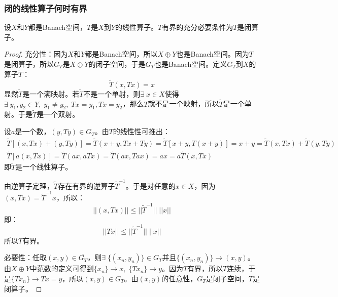 \subsubsection{闭的线性算子何时有界}
\begin{theorem}
	设$X$和$Y$都是Banach空间，$T$是$X$到$Y$的线性算子。$T$有界的充分必要条件为$T$是闭算子。
\end{theorem}
\begin{proof}
	充分性：因为$X$和$Y$都是Banach空间，所以$X\oplus Y$也是Banach空间。因为$T$是闭算子，所以$G_T$是$X\oplus Y$的闭子空间，于是$G_T$也是Banach空间。定义$G_T$到$X$的算子$\tilde{T}$：
	\begin{equation*}
		\tilde{T}(x,Tx)=x
	\end{equation*}
	显然$\tilde{T}$是一个满映射。若$\tilde{T}$不是一个单射，则$\exists\;x\in X$使得$\exists\;y_1,y_2\in Y,\;y_1\ne y_2,\;Tx=y_1,Tx=y_2$，那么$T$就不是一个映射，所以$\tilde{T}$是一个单射。于是$\tilde{T}$是一个双射。\par
	设$a$是一个数，$(y,Ty)\in G_T$。由$T$的线性性可推出：
	\begin{gather*}
		\tilde{T}[(x,Tx)+(y,Ty)]=\tilde{T}(x+y,Tx+Ty)=\tilde{T}[x+y,T(x+y)]=x+y=\tilde{T}(x,Tx)+\tilde{T}(y,Ty) \\
		\tilde{T}[a(x,Tx)]=\tilde{T}(ax,aTx)=\tilde{T}(ax,Tax)=ax=a\tilde{T}(x,Tx)
	\end{gather*}
	即$\tilde{T}$是一个线性算子。\par
	由逆算子定理，$\tilde{T}$存在有界的逆算子$\tilde{T}^{-1}$。于是对任意的$x\in X$，因为$(x,Tx)=\tilde{T}^{-1}x$，所以：
	\begin{equation*}
		||(x,Tx)||\leqslant||\tilde{T}^{-1}||\;||x||
	\end{equation*}
	即：
	\begin{equation*}
		||Tx||\leqslant||\tilde{T}^{-1}||\;||x||
	\end{equation*}
	所以$T$有界。\par
	必要性：任取$(x,y)\in\overline{G_T}$，则$\exists\;\{(x_n,y_n)\}\in G_T$并且$\{(x_n,y_n)\}\to (x,y)$。由$X\oplus Y$中范数的定义可得到$\{x_n\}\to x,\;\{Tx_n\}\to y$。因为$T$有界，所以$T$连续，于是$\{Tx_n\}\to Tx=y$，所以$(x,y)\in G_T$。由$(x,y)$的任意性，$G_T$是闭子空间，$T$是闭算子。
\end{proof}
